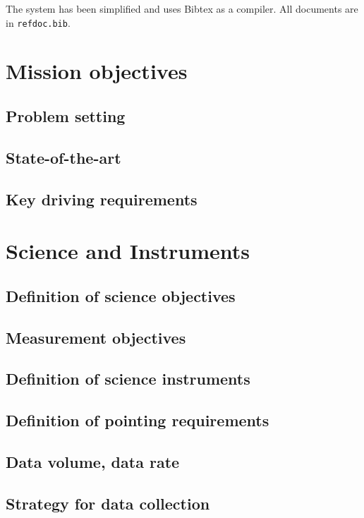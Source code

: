         The system has been simplified and uses Bibtex as a compiler. All documents are in \texttt{refdoc.bib}.
        
        
           
\section{Mission objectives} 

\subsection{Problem setting}

\subsection{State-of-the-art}

\subsection{Key driving requirements} 


\section{Science and Instruments}
\subsection{Definition of science objectives}
\subsection{Measurement objectives}
\subsection{Definition of science instruments}
\subsection{Definition of pointing requirements}
\subsection{Data volume, data rate}
\subsection{Strategy for data collection}


